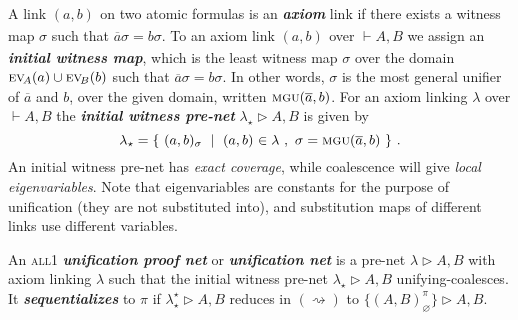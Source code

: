 \documentclass[twoside,a4paper]{article}
\makeatletter
\newcommand\defn[1]{\textit{\textbf{#1}}}
\newcommand\all{\textsc{all}}
\newcommand\ex[2][{}]{\textsc{ev}_{#1}(#2)}
\newcommand\+{+}
\renewcommand\*{\times}
\newcommand\dual[1]{\overline{#1}}
\newcommand\seq[2]{{\vdash}#1,#2}
\newcommand\Seq{\vphantom(\seq}
\newcommand\Prf[3]{\deduce{\Seq{#2}{#3}}{\vphantom(#1}}
\newcommand\net[3]{#1\triangleright #2,#3}
\newcommand\mgu{\textsc{mgu}}
\newcommand\coh{\smallfrown}
\newcommand\join{\vee}
\newcommand\init[2]{\mgu(#1,#2)}
\newcommand\link[3][\sigma]{(#2,#3)_{#1}}
\newcommand\ucoal{\rightsquigarrow}
\newcommand\srr[1]{
  \ifx#1+\expandafter\@srr\else
  \ifx#1*\*\mathrm S\else
  \ifx#1!\forall\mathrm S\else
  \ifx#1?\exists\mathrm S\else 
  \ifx#11\mathrm{axS}\else
  #1\mathrm S  \fi\fi\fi\fi\fi
}
\newcommand\@srr[1]{+\mathrm S,{#1}}
\newcommand\urr[1]{
  \ifx#1+\expandafter\@urr\else
  \ifx#1*\*\mathrm U\else
  \ifx#1!\forall\mathrm U\else
  \ifx#1?\exists\mathrm U\else 
  \ifx#11\mathrm{axU}\else
  #1\mathrm U
  \fi\fi\fi\fi\fi
}
\newcommand\@urr[1]{+\mathrm U,{#1}}
\makeatother
\begin{document}
%
A link $\link[]ab$ on two atomic formulas is an \defn{axiom} link if there exists a witness map $\sigma$ such that $\dual a\sigma=b\sigma$. To an axiom link $\link[]ab$ over $\seq AB$ we assign an \defn{initial witness map}, which is the least witness map $\sigma$ over the domain $\ex[\!A]a\cup\ex[\!B]b$ such that $\dual a\sigma=b\sigma$. In other words, $\sigma$ is the most general unifier of $\dual a$ and $b$, over the given domain, written $\init{\dual a}b$. For an axiom linking $\lambda$ over $\seq AB$ the \defn{initial witness pre-net} $\net{\lambda_\star}AB$ is given by
\[
	\lambda_\star = \{~\link ab~\mid~\link[]ab\in\lambda~,~\sigma=\init{\dual a}b~\}~.
\]
An initial witness pre-net has \emph{exact coverage}, while coalescence will give \emph{local eigenvariables}. Note that eigenvariables are constants for the purpose of unification (they are not substituted into), and substitution maps of different links use different variables.



\begin{definition}
An \all1 \defn{unification proof net} or \defn{unification net} is a pre-net $\net\lambda AB$ with axiom linking $\lambda$ such that the initial witness pre-net $\net{\lambda_\star}AB$ unifying-coalesces. It \defn{sequentializes} to $\pi$ if $\net{\lambda^\star_\star}AB$ reduces in $(\ucoal)$ to $\net{\{\link[\varnothing]AB^\pi\}}AB$.
\end{definition}
\end{document}

